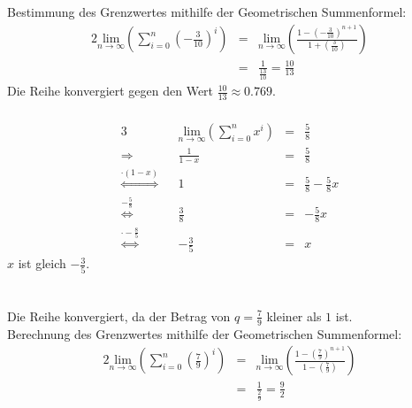 \documentclass[10pt,a4paper,oneside,ngerman,numbers=noenddot]{scrartcl}
\begin{document}
\subsection{} %
\subsubsection{} %
Bestimmung des Grenzwertes mithilfe der Geometrischen Summenformel:\\
\begin{alignat*}{2}
\underset{n \rightarrow \infty}{\text{lim}} \left( \sum\limits_{i=0}^{n} \left(-\frac{3}{10}\right)^{i} \right) &=& \underset{n \rightarrow \infty}{\text{lim}} \left(\frac{1-\left(-\frac{3}{10}\right)^{n+1}}{1+\left(\frac{3}{10}\right)} \right) \\
&=& \frac{1}{\frac{13}{10}} = \frac{10}{13}
\end{alignat*}
Die Reihe konvergiert gegen den Wert $\frac{10}{13} \approx 0.769$.
\subsubsection{} %
\begin{alignat*}{3}
&& \underset{n \rightarrow \infty}{\text{lim}} \left( \sum\limits_{i=0}^{n} x^{i} \right) &=& \frac{5}{8} \\
\Rightarrow && \frac{1}{1-x} &=& \frac{5}{8} \\
\overset{\cdot (1-x)}{\Leftrightarrow} && 1 &=& \frac{5}{8} - \frac{5}{8}x \\
\overset{-\frac{5}{8}}{\Leftrightarrow} && \frac{3}{8} &=& -\frac{5}{8}x \\
\overset{\cdot -\frac{8}{5}}{\Leftrightarrow} && -\frac{3}{5} &=& x
\end{alignat*}
$x$ ist gleich $-\frac{3}{5}$.
\section{} %
\subsection{}
\subsubsection{} %
Die Reihe konvergiert, da der Betrag von $q = \frac{7}{9}$ kleiner als $1$ ist.\\
Berechnung des Grenzwertes mithilfe der Geometrischen Summenformel:\\
\begin{alignat*}{2}
\underset{n \rightarrow \infty}{\text{lim}} \left( \sum\limits_{i=0}^{n} \left(\frac{7}{9}\right)^{i} \right) &=& \underset{n \rightarrow \infty}{\text{lim}} \left(\frac{1-\left(\frac{7}{9}\right)^{n+1}}{1-\left(\frac{7}{9}\right)} \right) \\
&=& \frac{1}{\frac{2}{9}} = \frac{9}{2}
\end{alignat*}
\end{document}
